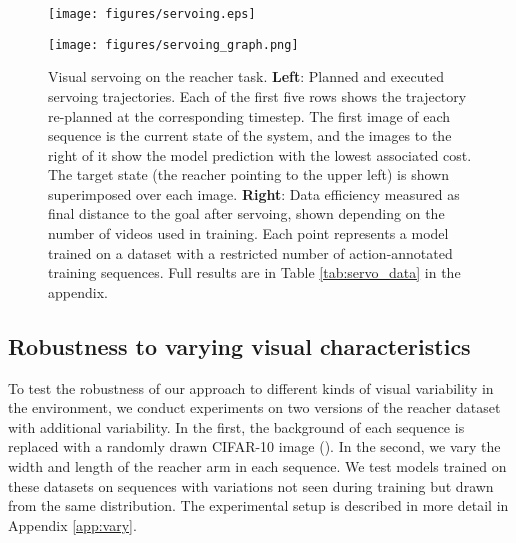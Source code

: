 \documentclass{article} %
\begin{document}
\begin{figure}
\centering

\begin{minipage}[b]{0.38\linewidth}
\centering
\texttt{[image: figures/servoing.eps]}
  \vspace{-0.25cm}
\end{minipage}
\hspace{0.01\linewidth}
\texttt{[image: figures/servoing\_graph.png]}
\vspace{-7pt}
\caption{Visual servoing on the reacher task. \textbf{Left}: Planned and executed servoing trajectories.  Each of the first five rows shows the trajectory re-planned at the corresponding timestep. The first image of each sequence is the current state of the system, and the images to the right of it show the model prediction with the lowest associated cost. The target state (the reacher pointing to the upper left) is shown superimposed over each image. %
\textbf{Right}: Data efficiency measured as final distance to the goal after servoing, shown depending on the number of videos used in training. Each point represents a model trained on a dataset with a restricted number of action-annotated training sequences. Full results are in Table \ref{tab:servo_data} in the appendix. %
} 
   \label{fig:servo}
   \vspace{-10pt}
\end{figure}


\subsection{Robustness to varying visual characteristics}

To test the robustness of our approach to different kinds of visual variability in the environment, we conduct experiments on two versions of the reacher dataset with additional variability. In the first, the background of each sequence is replaced with a randomly drawn CIFAR-10 image (\cite{krizhevsky2009LearningML}). In the second, we vary the width and length of the reacher arm in each sequence. We test models trained on these datasets on sequences with variations not seen during training but drawn from the same distribution. The experimental setup is described in more detail in Appendix \ref{app:vary}.
\end{document}

